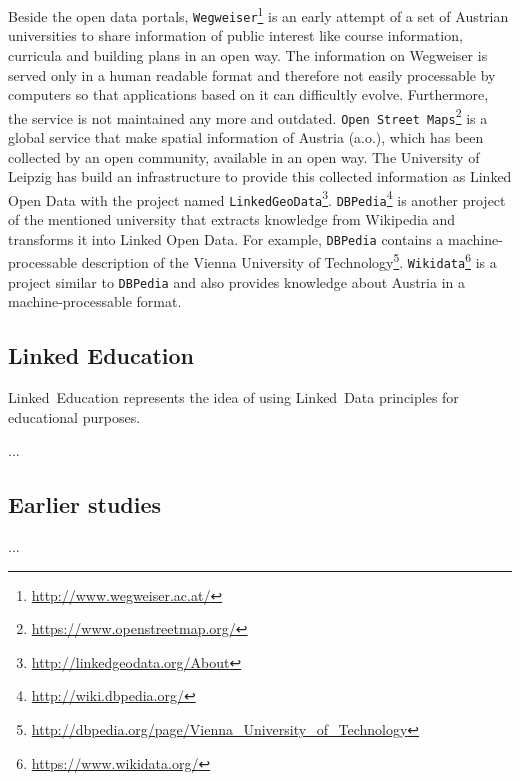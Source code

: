 \documentclass{article}
\begin{document}
Beside the open data portals, \texttt{Wegweiser}\footnote{\url{http://www.wegweiser.ac.at/}} is an early attempt of a set of Austrian universities to share information of public interest like course information, curricula and building plans in an open way. The information on Wegweiser is served only in a human readable format and therefore not easily processable by computers so that applications based on it can difficultly evolve. Furthermore, the service is not maintained any more and outdated. \texttt{Open Street Maps}\footnote{\url{https://www.openstreetmap.org/}} is a global service that make spatial information of Austria (a.o.), which has been collected by an open community, available in an open way. The University of Leipzig has build an infrastructure to provide this collected information as Linked Open Data with the project named \texttt{LinkedGeoData}\footnote{\url{http://linkedgeodata.org/About}}. \texttt{DBPedia}\footnote{\url{http://wiki.dbpedia.org/}} is another project of the mentioned university that extracts knowledge from Wikipedia and transforms it into Linked Open Data. For example, \texttt{DBPedia} contains a machine-processable description of the Vienna University of Technology\footnote{\url{http://dbpedia.org/page/Vienna_University_of_Technology}}. \texttt{Wikidata}\footnote{\url{https://www.wikidata.org/}} is a project similar to \texttt{DBPedia} and also provides knowledge about Austria in a machine-processable format. 

\subsection{Linked Education}
\label{related-work:linked-education}
Linked~Education represents the idea of using Linked~Data principles for educational purposes. 

...
\subsection{Earlier studies}
\label{related-work:earlier-studies}
...

\end{document}
